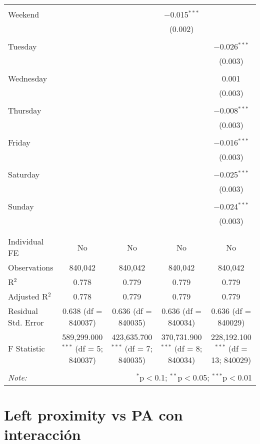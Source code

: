 \documentclass[
]{article}
\begin{document}
\begin{table}[!htbp]
{\begin{tabular}{@{\extracolsep{5pt}}lcccc}
  & & & & \\ 
 Weekend &  &  & $-$0.015$^{***}$ &  \\ 
  &  &  & (0.002) &  \\ 
  & & & & \\ 
 Tuesday &  &  &  & $-$0.026$^{***}$ \\ 
  &  &  &  & (0.003) \\ 
  & & & & \\ 
 Wednesday &  &  &  & 0.001 \\ 
  &  &  &  & (0.003) \\ 
  & & & & \\ 
 Thursday &  &  &  & $-$0.008$^{***}$ \\ 
  &  &  &  & (0.003) \\ 
  & & & & \\ 
 Friday &  &  &  & $-$0.016$^{***}$ \\ 
  &  &  &  & (0.003) \\ 
  & & & & \\ 
 Saturday &  &  &  & $-$0.025$^{***}$ \\ 
  &  &  &  & (0.003) \\ 
  & & & & \\ 
 Sunday &  &  &  & $-$0.024$^{***}$ \\ 
  &  &  &  & (0.003) \\ 
  & & & & \\ 
\hline \\[-1.8ex] 
Individual FE & No & No & No & No \\ 
Observations & 840,042 & 840,042 & 840,042 & 840,042 \\ 
R$^{2}$ & 0.778 & 0.779 & 0.779 & 0.779 \\ 
Adjusted R$^{2}$ & 0.778 & 0.779 & 0.779 & 0.779 \\ 
Residual Std. Error & 0.638 (df = 840037) & 0.636 (df = 840035) & 0.636 (df = 840034) & 0.636 (df = 840029) \\ 
F Statistic & 589,299.000$^{***}$ (df = 5; 840037) & 423,635.700$^{***}$ (df = 7; 840035) & 370,731.900$^{***}$ (df = 8; 840034) & 228,192.100$^{***}$ (df = 13; 840029) \\ 
\hline 
\hline \\[-1.8ex] 
\textit{Note:}  & \multicolumn{4}{r}{$^{*}$p$<$0.1; $^{**}$p$<$0.05; $^{***}$p$<$0.01} \\ 
\end{tabular}
} 
\end{table} 
\newpage
\section{Left proximity vs PA con interacción}
\end{document}
